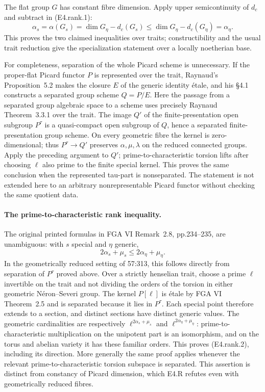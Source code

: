The flat group $G$ has constant fibre dimension. Apply upper
semicontinuity of $d_c$ and subtract in (E4.rank.1):
\[
 \alpha_s=\alpha(G_s)
 =\dim G_\eta-d_c(G_s)
 \le\dim G_\eta-d_c(G_\eta)=\alpha_\eta.
\]
This proves the two claimed inequalities over traits; constructibility
and the usual trait reduction give the specialization statement over a
locally noetherian base.

For completeness, separation of the whole Picard scheme is unnecessary.
If the proper-flat Picard functor $P$ is represented over the trait,
Raynaud's Proposition~5.2 makes the closure $E$ of the generic identity
\'etale, and his \S4.1 constructs a separated group scheme $Q=P/E$.
Here the passage from a separated group algebraic space to a scheme uses
precisely Raynaud Theorem~3.3.1 over the trait.
The image $Q'$ of the finite-presentation open subgroup $P^\tau$ is a
quasi-compact open subgroup of $Q$, hence a separated finite-presentation
group scheme. On every geometric fibre the kernel is zero-dimensional;
thus $P^\tau\to Q'$ preserves $\alpha,\mu,\lambda$ on the reduced connected
groups. Apply the preceding argument to $Q'$; prime-to-characteristic
torsion lifts after choosing $\ell$ also prime to the finite special
kernel. This proves the same conclusion when the represented tau-part
is nonseparated. The statement is not extended here to an arbitrary
nonrepresentable Picard functor without checking the same quotient data.

\paragraph{The prime-to-characteristic rank inequality.}
The original printed formulas in FGA VI Remark~2.8, pp.234--235,
are unambiguous: with $s$ special and $\eta$ generic,
\[
 2\alpha_s+\mu_s\le 2\alpha_\eta+\mu_\eta.       \tag{E4.rank.2}
\]
In the geometrically reduced setting of 57:313, this follows directly
from separation of $P^\tau$ proved above. Over a strictly henselian
trait, choose a prime $\ell$ invertible on the trait and not dividing
the orders of the torsion in either geometric N\'eron--Severi group.
The kernel $P[\ell]$ is \'etale by FGA VI Theorem~2.5 and is separated
because it lies in $P^\tau$. Each special point therefore extends to
a section, and distinct sections have distinct generic values.
The geometric cardinalities are respectively
$\ell^{2\alpha_s+\mu_s}$ and
$\ell^{2\alpha_\eta+\mu_\eta}$: prime-to-characteristic
multiplication on the unipotent part is an isomorphism, and on the
torus and abelian variety it has these familiar orders.
This proves (E4.rank.2), including its direction.
More generally the same proof applies whenever the relevant
prime-to-characteristic torsion subspace is separated.
This assertion is distinct from constancy of Picard dimension,
which E4.R refutes even with geometrically reduced fibres.


